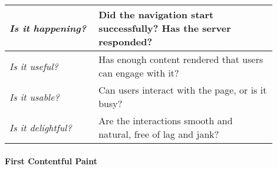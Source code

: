  
\begin{center}
\small
	\begin{tabular}{ | p{0.3\linewidth} | p{0.6\linewidth} | }
	\hline
	\textit{Is it happening?} & 	Did the navigation start successfully? Has the server responded? \\
	\hline
	\textit{Is it useful?} & Has enough content rendered that users can engage with it? \\
	\hline
	\textit{Is it usable?} & Can users interact with the page, or is it busy? \\
	\hline
	\textit{Is it delightful?} & Are the interactions smooth and natural, free of lag and jank? \\
	\hline
	\end{tabular}
\end{center}












 







\paragraph{First Contentful Paint}






